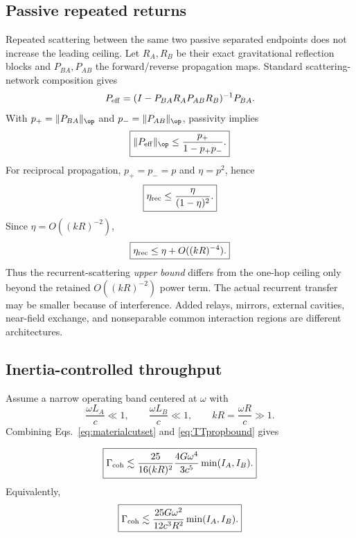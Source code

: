 \subsection{Passive repeated returns}

Repeated scattering between the same two passive separated endpoints does not increase the leading ceiling. Let $R_A,R_B$ be their exact gravitational reflection blocks and $P_{BA},P_{AB}$ the forward/reverse propagation maps. Standard scattering-network composition gives \cite{Redheffer1962}
\begin{equation}
P_{\rm eff}
=(I-P_{BA}R_AP_{AB}R_B)^{-1}P_{BA}.
\label{eq:Peff}
\end{equation}
With $p_+=\|P_{BA}\|_{\op}$ and $p_-=\|P_{AB}\|_{\op}$, passivity implies
\begin{equation}
\boxed{
\|P_{\rm eff}\|_{\op}
\le\frac{p_+}{1-p_+p_-}.}
\label{eq:Peffbound}
\end{equation}
For reciprocal propagation, $p_+=p_-=p$ and $\eta=p^2$, hence
\begin{equation}
\boxed{
\eta_{\rm rec}\le\frac{\eta}{(1-\eta)^2}.}
\label{eq:etarec}
\end{equation}
Since $\eta=O((kR)^{-2})$,
\begin{equation}
\boxed{
\eta_{\rm rec}\le \eta+O((kR)^{-4}).}
\label{eq:recurrentorder}
\end{equation}
Thus the recurrent-scattering \emph{upper bound} differs from the one-hop ceiling only beyond the retained $O((kR)^{-2})$ power term. The actual recurrent transfer may be smaller because of interference. Added relays, mirrors, external cavities, near-field exchange, and nonseparable common interaction regions are different architectures.

\subsection{Inertia-controlled throughput}

Assume a narrow operating band centered at $\omega$ with
\begin{equation}
\frac{\omega L_A}{c}\ll1,
\qquad
\frac{\omega L_B}{c}\ll1,
\qquad
kR=\frac{\omega R}{c}\gg1.
\label{eq:regime}
\end{equation}
Combining Eqs.~\eqref{eq:materialcutset} and \eqref{eq:TTpropbound} gives
\begin{theorem}
\begin{equation}
\boxed{
\Gamma_{\rm coh}
\lesssim
\frac{25}{16(kR)^2}
\frac{4G\omega^4}{3c^5}
\min(I_A,I_B).}
\label{eq:combined1}
\end{equation}
Equivalently,
\begin{equation}
\boxed{
\Gamma_{\rm coh}
\lesssim
\frac{25G\omega^2}{12c^3R^2}
\min(I_A,I_B).}
\label{eq:combined2}
\end{equation}
\end{theorem}

